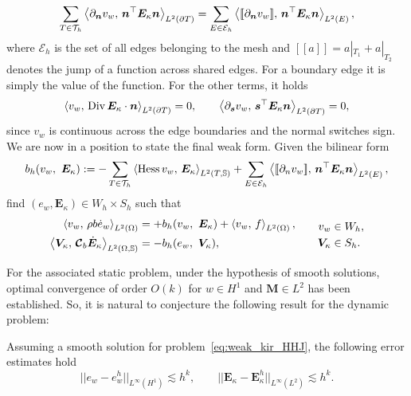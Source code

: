 \begin{equation*}
\sum_{T \in \mathcal{T}_h} \inner[L^2(\partial T)]{\partial_{\bm{n}} v_w}{\bm{n}^\top\bm{E}_\kappa \bm{n}} = \sum_{E \in \mathcal{E}_h} \inner[L^2(E)]{[\![\partial_{\bm{n}} v_w]\!]}{\bm{n}^\top\bm{E}_\kappa \bm{n}},
\end{equation*} 
where $\mathcal{E}_h$ is the set of all edges belonging to the mesh and $[\![a]\!] = a|_{T_1} + a|_{T_2}$ denotes the jump of a function across shared edges. For a boundary edge it is simply the value of the function. For the other terms, it holds 
\[
\inner[L^2(\partial T)]{v_w}{\Div \bm{E}_\kappa \cdot \bm{n}} = 0, \qquad \inner[L^2(\partial T)]{\partial_{\bm{s}} v_w}{\bm{s}^\top\bm{E}_\kappa \bm{n}} = 0,
\]
since $v_w$ is continuous across the edge boundaries and the normal switches sign. We are now in a position to state the final weak form. Given the bilinear form
\[
b_h(v_w, \ \bm{E}_{\kappa}) := - \sum_{T \in \mathcal{T}_h} \inner[L^2(T, \mathbb{S})]{\Hess v_w}{\bm{E}_\kappa} + \sum_{E \in \mathcal{E}_h} \inner[L^2(E)]{[\![\partial_n v_w]\!]}{\bm{n}^\top\bm{E}_\kappa \bm{n}}, 
\]
find $(e_w, \bm{E}_\kappa) \in W_h \times S_h$ such that
\begin{equation}
\label{eq:weak_kir_HHJ}
\begin{aligned}
\inner[L^2(\Omega)]{v_w}{\rho b \dot{e}_w} &= +b_h(v_w, \ \bm{E}_{\kappa}) + \inner[L^2(\Omega)]{v_w}{f}, \\ 
\inner[L^2(\Omega, \mathbb{S})]{\bm{V}_\kappa}{\bm{\mathcal{C}}_b \dot{\bm{E}}_\kappa} &= -b_h(e_w, \ \bm{V}_{\kappa}), \\ 
\end{aligned} \qquad
\begin{aligned}
v_w &\in W_h, \\
\bm{V}_\kappa &\in S_h. \\
\end{aligned}
\end{equation}

For the associated static problem, under the hypothesis of smooth solutions, optimal convergence of order $O(k)$ for $w \in H^1$ and $\bm{M} \in L^2$ has been established. So, it is natural to conjecture the following result for the dynamic problem:
\begin{conjecture}\label{conj:HHJestimates}
	Assuming a smooth solution for problem~\eqref{eq:weak_kir_HHJ}, the following error estimates hold
	\begin{equation}
	\label{eq:errHHJ}
	||e_w - e_w^h||_{L^{\infty} (H^1)} \lesssim h^{k}, \qquad
	||\bm{E}_\kappa - \bm{E}_\kappa^h||_{L^{\infty} (L^2)} \lesssim h^{k}.
	\end{equation}
\end{conjecture}

